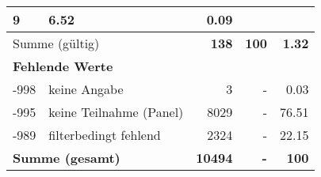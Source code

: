 \begin{longtable}{lXrrr}
       \num{9} &
       \num[round-mode=places,round-precision=2]{6,52} &
         \num[round-mode=places,round-precision=2]{0,09} \\
     \midrule
     \multicolumn{2}{l}{Summe (gültig)} &
       \textbf{\num{138}} &
     \textbf{100} &
       \textbf{\num[round-mode=places,round-precision=2]{1,32}} \\
     \multicolumn{5}{l}{\textbf{Fehlende Werte}}\\
       -998 &
       keine Angabe &
         \num{3} &
        - &
         \num[round-mode=places,round-precision=2]{0,03} \\
       -995 &
       keine Teilnahme (Panel) &
         \num{8029} &
        - &
         \num[round-mode=places,round-precision=2]{76,51} \\
       -989 &
       filterbedingt fehlend &
         \num{2324} &
        - &
         \num[round-mode=places,round-precision=2]{22,15} \\
     \midrule
     \multicolumn{2}{l}{\textbf{Summe (gesamt)}} &
          \textbf{\num{10494}} &
        \textbf{-} &
        \textbf{100} \\
     \bottomrule
     \end{longtable}
     
